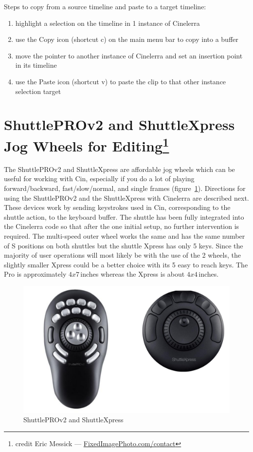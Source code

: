 \noindent Steps to copy from a source timeline and paste to a target timeline:

\begin{enumerate}
    \item highlight a selection on the timeline in 1 instance of Cinelerra
    \item use the Copy icon (shortcut c)  on the main menu bar to copy into a buffer
    \item move the pointer to another instance of Cinelerra and set an insertion point in its timeline
    \item use the Paste icon (shortcut v) to paste the clip to that other instance selection target
\end{enumerate}

\section[ShuttlePROv2 and ShuttleXpress Jog Wheels for Editing]{ShuttlePROv2 and ShuttleXpress Jog Wheels for Editing\protect\footnote{credit Eric Messick --- \url{FixedImagePhoto.com/contact}}}%
\label{sec:shuttle_jog_wheels_editing}


The ShuttlePROv2 and ShuttleXpress are affordable jog wheels which can be useful for working with Cin, especially if you do a lot of playing forward/backward, fast/slow/normal, and single frames (figure~\ref{fig:shuttle}).
Directions for using the ShuttlePROv2 and the ShuttleXpress with Cinelerra are described next. These devices work by sending keystrokes used in Cin, corresponding to the shuttle action, to the keyboard buffer. The shuttle has been fully integrated into the Cinelerra code so that after the one initial setup, no further intervention is required.  The multi-speed outer wheel works the same and has the same number of S positions on both shuttles but the shuttle Xpress has only 5 keys.  Since the majority of user operations will most likely be with the use of the 2 wheels, the slightly smaller Xpress could be a better choice with its 5 easy to reach keys.  The Pro is approximately $4x7$\,inches whereas the Xpress is about $4x4$\,inches.

\begin{figure}[htpb]
    \centering
    \includegraphics[width=0.9\linewidth]{images/shuttle.png}
    \caption{ShuttlePROv2 and ShuttleXpress}
    \label{fig:shuttle}
\end{figure}


